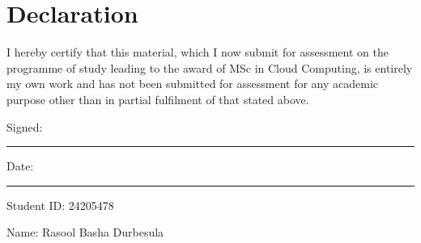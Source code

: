 \section*{Declaration}

I hereby certify that this material, which I now submit for assessment on the programme of study leading to the award of MSc in Cloud Computing, is entirely my own work and has not been submitted for assessment for any academic purpose other than in partial fulfilment of that stated above.

\vspace{1cm}

\noindent Signed: \rule{5cm}{0.4pt}

\vspace{0.5cm}

\noindent Date: \rule{5cm}{0.4pt}

\vspace{1cm}

\noindent Student ID: 24205478

\noindent Name: Rasool Basha Durbesula
